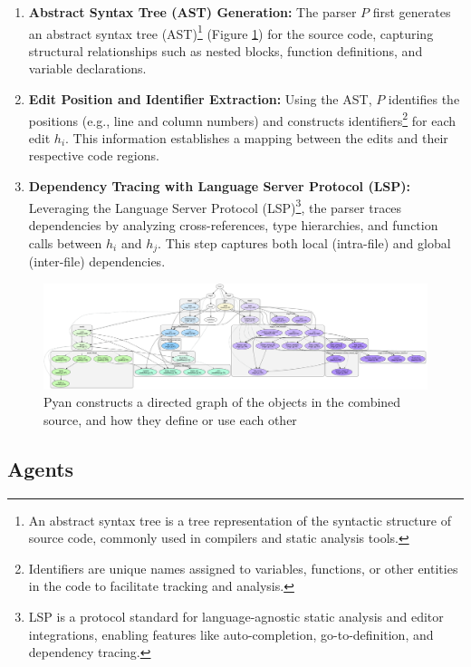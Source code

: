 \begin{enumerate}
    \item \textbf{Abstract Syntax Tree (AST) Generation:}  
    The parser \( P \) first generates an abstract syntax tree (AST)\footnote{An abstract syntax tree is a tree representation of the syntactic structure of source code, commonly used in compilers and static analysis tools.} (Figure \ref{fig:dependency_graph}) for the source code, capturing structural relationships such as nested blocks, function definitions, and variable declarations.

    \item \textbf{Edit Position and Identifier Extraction:}  
    Using the AST, \( P \) identifies the positions (e.g., line and column numbers) and constructs identifiers\footnote{Identifiers are unique names assigned to variables, functions, or other entities in the code to facilitate tracking and analysis.} for each edit \( h_i \). This information establishes a mapping between the edits and their respective code regions.

    \item \textbf{Dependency Tracing with Language Server Protocol (LSP):}  
    Leveraging the Language Server Protocol (LSP)\footnote{LSP is a protocol standard for language-agnostic static analysis and editor integrations, enabling features like auto-completion, go-to-definition, and dependency tracing.}, the parser traces dependencies by analyzing cross-references, type hierarchies, and function calls between \( h_i \) and \( h_j \). This step captures both local (intra-file) and global (inter-file) dependencies.
\end{enumerate}

\begin{figure}
    \centering
    \includegraphics[width=0.8\linewidth]{fig/dependency_graph.png}
    \caption{Pyan constructs a directed graph of the objects in the combined source, and how they define or use each other}
    \label{fig:dependency_graph}
\end{figure}

\subsection{Agents}

